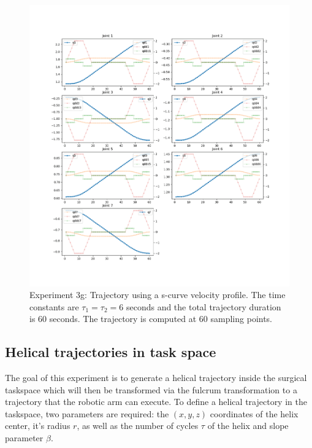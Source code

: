 \begin{center}
\begin{figure}[H]
\centering
\includegraphics[width=\textwidth]{images/robot_planner3/3g_s_curve.png}
\caption{Experiment 3g: Trajectory using a s-curve velocity profile. The time constants are $τ_1 = τ_2 = 6$ seconds and the total trajectory duration is 60 seconds. The trajectory is computed at 60 sampling points.}
\label{robot-planner3g-joint-s-curve}
\end{figure}
\end{center}


\subsection{Helical trajectories in task space}

The goal of this experiment is to generate a helical trajectory inside the surgical taskspace which will then be transformed via the fulcrum transformation 
to a trajectory that the robotic arm can execute. To define a helical trajectory in the taskspace, two parameters are required: the $(x,y,z)$ coordinates of the 
helix center, it's radius $r$, as well as the number of cycles $τ$ of the helix and slope parameter $β$.\\ 

